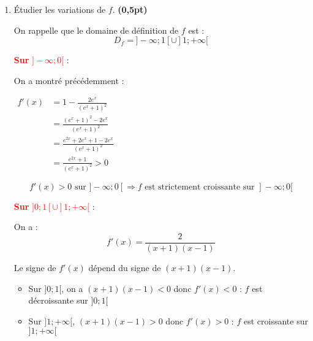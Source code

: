 \documentclass[12pt,a4paper]{article}
\begin{document}
\begin{enumerate}
\item Étudier les variations de \( f \). \hfill \textbf{(0,5pt)}

On rappelle que le domaine de définition de \( f \) est :
\[
D_f = ]-\infty ; 1[ \cup ]1 ; +\infty[
\]

\textcolor{red}{\textbf{Sur } \( ]-\infty ; 0[ \)} :

On a montré précédemment :

\(
\begin{aligned}
    f'(x) &= 1 - \frac{2e^x}{(e^x + 1)^2}\\
          &=\frac{(e^x + 1)^2-2e^x}{(e^x + 1)^2}\\
          &=\frac{e^{2x}+2e^x+1-2e^{x}}{(e^x + 1)^2}\\
          &=\frac{e^{2x}+1}{(e^x + 1)^2}>0
\end{aligned}
\)

\[
f'(x) > 0 \text{ sur } ]-\infty ; 0[
\Rightarrow f \text{ est strictement croissante sur } ]-\infty ; 0[
\]

\vspace{1em}

\textcolor{red}{\textbf{Sur } \( ]0 ; 1[ \cup ]1 ; +\infty[ \)} :

On a :
\[
f'(x) = \frac{2}{(x + 1)(x - 1)}
\]

Le signe de \( f'(x) \) dépend du signe de \( (x + 1)(x - 1) \).


\begin{itemize}
    \item Sur \( ]0 ; 1[ \), on a \( (x + 1)(x - 1) < 0 \)  
          donc \( f'(x) < 0 \) : \( f \) est décroissante sur \( ]0 ; 1[ \)

    \item Sur \( ]1 ; +\infty[ \), \( (x + 1)(x - 1) > 0 \)  
          donc \( f'(x) > 0 \) : \( f \) est croissante sur \( ]1 ; +\infty[ \)
\end{itemize}

\vspace{1em}



\end{enumerate}
\end{document}

